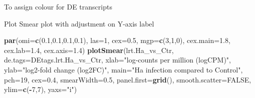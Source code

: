 \documentclass[
]{article}
\newenvironment{Shaded}{\begin{snugshade}}{\end{snugshade}}
\newcommand{\AttributeTok}[1]{\textcolor[rgb]{0.13,0.29,0.53}{#1}}
\newcommand{\ConstantTok}[1]{\textcolor[rgb]{0.56,0.35,0.01}{#1}}
\newcommand{\DecValTok}[1]{\textcolor[rgb]{0.00,0.00,0.81}{#1}}
\newcommand{\FloatTok}[1]{\textcolor[rgb]{0.00,0.00,0.81}{#1}}
\newcommand{\FunctionTok}[1]{\textcolor[rgb]{0.13,0.29,0.53}{\textbf{#1}}}
\newcommand{\NormalTok}[1]{#1}
\newcommand{\OtherTok}[1]{\textcolor[rgb]{0.56,0.35,0.01}{#1}}
\newcommand{\SpecialCharTok}[1]{\textcolor[rgb]{0.81,0.36,0.00}{\textbf{#1}}}
\newcommand{\StringTok}[1]{\textcolor[rgb]{0.31,0.60,0.02}{#1}}
\begin{document}
To assign colour for DE transcripts

\begin{Shaded}
\end{Shaded}

Plot Smear plot with adjustment on Y-axis label

\begin{Shaded}
\begin{Highlighting}[]
\FunctionTok{par}\NormalTok{(}\AttributeTok{omi=}\FunctionTok{c}\NormalTok{(}\FloatTok{0.1}\NormalTok{,}\FloatTok{0.1}\NormalTok{,}\FloatTok{0.1}\NormalTok{,}\FloatTok{0.1}\NormalTok{), }\AttributeTok{las=}\DecValTok{1}\NormalTok{, }\AttributeTok{cex=}\FloatTok{0.5}\NormalTok{, }\AttributeTok{mgp=}\FunctionTok{c}\NormalTok{(}\DecValTok{3}\NormalTok{,}\DecValTok{1}\NormalTok{,}\DecValTok{0}\NormalTok{), }\AttributeTok{cex.main=}\FloatTok{1.8}\NormalTok{, }\AttributeTok{cex.lab=}\FloatTok{1.4}\NormalTok{, }\AttributeTok{cex.axis=}\FloatTok{1.4}\NormalTok{)}
\FunctionTok{plotSmear}\NormalTok{(lrt.Ha\_vs\_Ctr, }\AttributeTok{de.tags=}\NormalTok{DEtags.lrt.Ha\_vs\_Ctr, }\AttributeTok{xlab=}\StringTok{"log{-}counts per million (logCPM)"}\NormalTok{, }\AttributeTok{ylab=}\StringTok{"log2{-}fold change (log2FC)"}\NormalTok{, }\AttributeTok{main=}\StringTok{"Ha infection compared to Control"}\NormalTok{, }\AttributeTok{pch=}\DecValTok{19}\NormalTok{, }\AttributeTok{cex=}\FloatTok{0.4}\NormalTok{, }\AttributeTok{smearWidth=}\FloatTok{0.5}\NormalTok{, }\AttributeTok{panel.first=}\FunctionTok{grid}\NormalTok{(), }\AttributeTok{smooth.scatter=}\ConstantTok{FALSE}\NormalTok{, }\AttributeTok{ylim=}\FunctionTok{c}\NormalTok{(}\SpecialCharTok{{-}}\DecValTok{7}\NormalTok{,}\DecValTok{7}\NormalTok{), }\AttributeTok{yaxs=}\StringTok{"i"}\NormalTok{)}
\end{Highlighting}
\end{Shaded}
\end{document}
